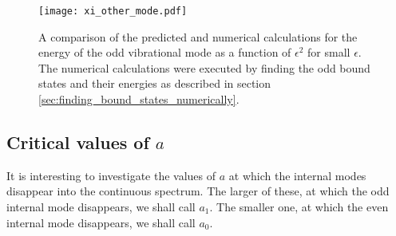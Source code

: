 \begin{figure}
\texttt{[image: xi\_other\_mode.pdf]}
\caption{\label{fig:xi_other_mode}A comparison of the predicted and numerical calculations for the energy of the odd vibrational mode as a function of $\epsilon^2$ for small $\epsilon$. The numerical calculations were executed by finding the odd bound states and their energies as described in section \ref{sec:finding_bound_states_numerically}.}
\end{figure}


\subsection{Critical values of $a$} \label{sec:a_crit}

It is interesting to investigate the values of $a$ at which the internal modes disappear into the continuous spectrum. The larger of these, at which the odd internal mode disappears, we shall call $a_1$. The smaller one, at which the even internal mode disappears, we shall call $a_0$. %




